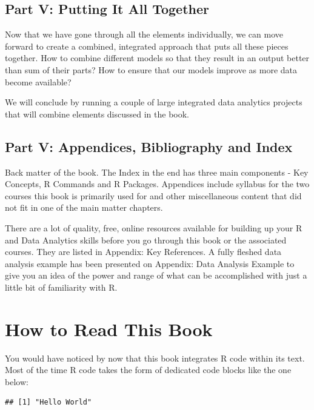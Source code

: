 \documentclass[11pt, letterpaper, twoside]{memoir}\usepackage{knitr}
\begin{document}
\subsection{Part V: Putting It All Together}

Now that we have gone through all the elements individually, we can move forward to create a combined, integrated approach that puts all these pieces together. How to combine different models so that they result in an output better than sum of their parts? How to ensure that our models improve as more data become available? 

We will conclude by running a couple of large integrated data analytics projects that will combine elements discussed in the book. 

\subsection{Part V: Appendices, Bibliography and Index}

Back matter of the book. The Index in the end has three main components - Key Concepts, R Commands and R Packages. Appendices include syllabus for the two courses this book is primarily used for and other miscellaneous content that did not fit in one of the main matter chapters.

There are a lot of quality, free, online resources available for building up your R and Data Analytics skills before you go through this book or the associated courses. They are listed in Appendix: Key References. A fully fleshed data analysis example has been presented on Appendix: Data Analysis Example to give you an idea of the power and range of what can be accomplished with just a little bit of familiarity with R.

\section*{How to Read This Book}

You would have noticed by now that this book integrates R code within its text. Most of the time R code takes the form of dedicated code blocks like the one below:  

\begin{knitrout}
\color{fgcolor}\begin{kframe}
\begin{alltt}
\hlstd{(}\hlstd{)}
\end{alltt}
\begin{verbatim}
## [1] "Hello World"
\end{verbatim}
\end{kframe}
\end{knitrout}
\end{document}

